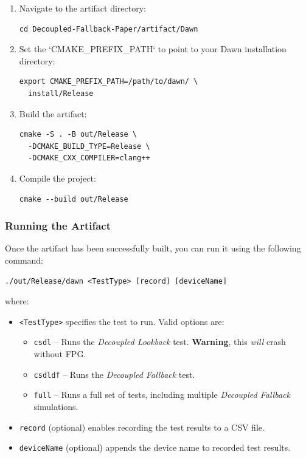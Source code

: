 \documentclass[sigconf]{acmart}
\begin{document}
\begin{enumerate}
  \item Navigate to the artifact directory:
        \begin{lstlisting}[basicstyle=\ttfamily\small, frame=single]
cd Decoupled-Fallback-Paper/artifact/Dawn
  \end{lstlisting}

  \item Set the `CMAKE\_PREFIX\_PATH` to point to your Dawn installation directory:
        \begin{lstlisting}[basicstyle=\ttfamily\small, frame=single]
export CMAKE_PREFIX_PATH=/path/to/dawn/ \
  install/Release
  \end{lstlisting}

  \item Build the artifact:
        \begin{lstlisting}[basicstyle=\ttfamily\small, frame=single]
cmake -S . -B out/Release \
  -DCMAKE_BUILD_TYPE=Release \
  -DCMAKE_CXX_COMPILER=clang++
  \end{lstlisting}

  \item Compile the project:
        \begin{lstlisting}[basicstyle=\ttfamily\small, frame=single]
cmake --build out/Release
  \end{lstlisting}
\end{enumerate}

\subsubsection{Running the Artifact}
Once the artifact has been successfully built, you can run it using the following command:

\begin{lstlisting}[basicstyle=\ttfamily\small, frame=single]
./out/Release/dawn <TestType> [record] [deviceName]
\end{lstlisting}

where:
\begin{itemize}
  \item \texttt{<TestType>} specifies the test to run. Valid options are:
        \begin{itemize}
          \item \texttt{csdl} – Runs the \emph{Decoupled Lookback} test. \textbf{Warning}, this \emph{will} crash without FPG\@.
          \item \texttt{csdldf} – Runs the \emph{Decoupled Fallback} test.
          \item \texttt{full} – Runs a full set of tests, including multiple \emph{Decoupled Fallback} simulations.
        \end{itemize}
  \item \texttt{record} (optional) enables recording the test results to a CSV file.
  \item \texttt{deviceName} (optional) appends the device name to recorded test results.
\end{itemize}



\end{document}
